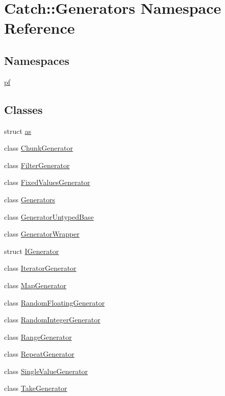 \hypertarget{namespace_catch_1_1_generators}{}\section{Catch\+:\+:Generators Namespace Reference}
\label{namespace_catch_1_1_generators}
\subsection*{Namespaces}
\begin{DoxyCompactItemize}
\item 
 \mbox{\hyperlink{namespace_catch_1_1_generators_1_1pf}{pf}}
\end{DoxyCompactItemize}
\subsection*{Classes}
\begin{DoxyCompactItemize}
\item 
struct \mbox{\hyperlink{struct_catch_1_1_generators_1_1as}{as}}
\item 
class \mbox{\hyperlink{class_catch_1_1_generators_1_1_chunk_generator}{Chunk\+Generator}}
\item 
class \mbox{\hyperlink{class_catch_1_1_generators_1_1_filter_generator}{Filter\+Generator}}
\item 
class \mbox{\hyperlink{class_catch_1_1_generators_1_1_fixed_values_generator}{Fixed\+Values\+Generator}}
\item 
class \mbox{\hyperlink{class_catch_1_1_generators_1_1_generators}{Generators}}
\item 
class \mbox{\hyperlink{class_catch_1_1_generators_1_1_generator_untyped_base}{Generator\+Untyped\+Base}}
\item 
class \mbox{\hyperlink{class_catch_1_1_generators_1_1_generator_wrapper}{Generator\+Wrapper}}
\item 
struct \mbox{\hyperlink{struct_catch_1_1_generators_1_1_i_generator}{I\+Generator}}
\item 
class \mbox{\hyperlink{class_catch_1_1_generators_1_1_iterator_generator}{Iterator\+Generator}}
\item 
class \mbox{\hyperlink{class_catch_1_1_generators_1_1_map_generator}{Map\+Generator}}
\item 
class \mbox{\hyperlink{class_catch_1_1_generators_1_1_random_floating_generator}{Random\+Floating\+Generator}}
\item 
class \mbox{\hyperlink{class_catch_1_1_generators_1_1_random_integer_generator}{Random\+Integer\+Generator}}
\item 
class \mbox{\hyperlink{class_catch_1_1_generators_1_1_range_generator}{Range\+Generator}}
\item 
class \mbox{\hyperlink{class_catch_1_1_generators_1_1_repeat_generator}{Repeat\+Generator}}
\item 
class \mbox{\hyperlink{class_catch_1_1_generators_1_1_single_value_generator}{Single\+Value\+Generator}}
\item 
class \mbox{\hyperlink{class_catch_1_1_generators_1_1_take_generator}{Take\+Generator}}
\end{DoxyCompactItemize}
